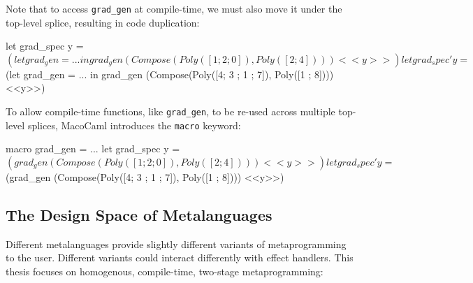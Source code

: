 Note that to access \texttt{grad_gen} at compile-time, we must also move it under the top-level splice, resulting in code duplication:

\begin{macocaml}
let grad_spec y  = $(let grad_gen = ... in 
                     grad_gen (Compose(Poly([1 ; 2 ; 0]), Poly([2 ; 4]))) <<y>>) 
let grad_spec' y = $(let grad_gen = ... in 
                     grad_gen (Compose(Poly([4; 3 ; 1 ; 7]), Poly([1 ; 8]))) <<y>>) 
\end{macocaml}

To allow compile-time functions, like \texttt{grad_gen}, to be re-used across multiple top-level splices, MacoCaml introduces the \texttt{macro} keyword:

\begin{macocaml}
macro grad_gen = ...  
let grad_spec y  = $(grad_gen (Compose(Poly([1 ; 2 ; 0]), Poly([2 ; 4]))) <<y>>) 
let grad_spec' y = $(grad_gen (Compose(Poly([4; 3 ; 1 ; 7]), Poly([1 ; 8]))) <<y>>) 
\end{macocaml}


\subsection{The Design Space of Metalanguages}\label{subsection:metaprogramming-design}
Different metalanguages provide slightly different variants of metaprogramming to the user. Different variants could interact differently with effect handlers. This thesis focuses on homogenous, compile-time, two-stage metaprogramming: 

